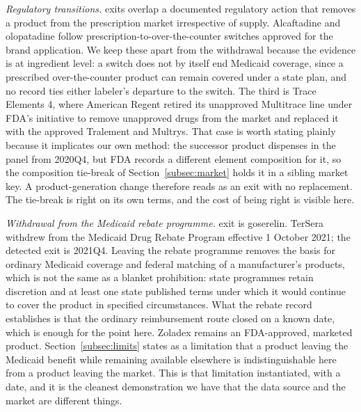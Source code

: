 \documentclass[pdflatex,sn-vancouver-num,Numbered]{sn-jnl}
\begin{document}
\emph{Regulatory transitions.} \nCauseTransitionUC exits overlap a documented regulatory action
that removes a product from the prescription market irrespective of supply. Alcaftadine and
olopatadine follow prescription-to-over-the-counter switches approved for the brand application.
We keep these apart from the withdrawal because the evidence is at ingredient level: a switch does
not by itself end Medicaid coverage, since a prescribed over-the-counter product can remain
covered under a state plan, and no record ties either labeler's departure to the switch. The third
is Trace Elements 4, where American Regent retired its unapproved Multitrace line under FDA's
initiative to remove unapproved drugs from the market and replaced it with the approved Tralement
and Multrys. That case is worth stating plainly because it implicates our own method: the
successor product dispenses in the panel from 2020Q4, but FDA records a different element
composition for it, so the composition tie-break of Section~\ref{subsec:market} holds it in a
sibling market key. A product-generation change therefore reads as an exit with no replacement.
The tie-break is right on its own terms, and the cost of being right is visible here.

\emph{Withdrawal from the Medicaid rebate programme.} \nCauseCoverageUC exit is goserelin.
TerSera withdrew from the Medicaid Drug Rebate Program effective 1 October 2021; the detected
exit is 2021Q4. Leaving the rebate programme removes the basis for ordinary Medicaid coverage
and federal matching of a manufacturer's products, which is not the same as a blanket
prohibition: state programmes retain discretion and at least one state published terms under
which it would continue to cover the product in specified circumstances. What the rebate record
establishes is that the ordinary reimbursement route closed on a known date, which is enough for
the point here. Zoladex remains an FDA-approved, marketed product. Section~\ref{subsec:limits} states as a limitation that a product
leaving the Medicaid benefit while remaining available elsewhere is indistinguishable here from a
product leaving the market. This is that limitation instantiated, with a date, and it is the
cleanest demonstration we have that the data source and the market are different things.
\end{document}
